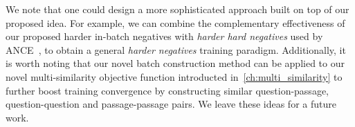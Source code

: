 %
We note that one could design a more sophisticated approach built on top of our proposed idea.
%
For example, we can combine the complementary effectiveness of our proposed harder in-batch negatives with \emph{harder hard negatives} used by ANCE~\cite{xiong2020approximate}, to obtain a general \emph{harder negatives} training paradigm.
%
Additionally, it is worth noting that our novel batch construction method can be applied to our novel multi-similarity objective function introducted in~\cref{ch:multi_similarity} to further boost training convergence by constructing similar question-passage, question-question and passage-passage pairs.
%
We leave these ideas for a future work.